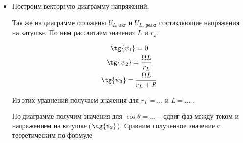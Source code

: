 \documentclass[a4paper, 12pt]{article}%
\begin{document}
\begin{itemize}
\begin{center}
\end{center}

\item Построим векторную диаграмму напряжений.

\begin{center}
	\begin{figure}[h]
	\end{figure}
\end{center}

Так же на диаграмме отложены $U_{L,\ \text{акт}}$ и $U_{L,\ \text{реакт}}$ составляющие напряжения на катушке. По ним рассчитаем значения $L$ и $r_L$.

\begin{equation}
\begin{gathered}
\tg{\psi_1} = 0\\
\tg{\psi_2} = \frac{\Omega L}{r_L}\\
\tg{\psi_3} = \frac{\Omega L}{r_L + R}\\
\end{gathered}
\end{equation}

Из этих уравнений получаем значения для $r_L = \dots$ и $L = \dots $ .

По диаграмме получим значения для $\cos{\theta} = \dots$ -- сдвиг фаз между током и напряжением на катушке ($\tg{\psi_2}$). Сравним полученное значение с теоретическим по формуле


\end{itemize}
\end{document}
